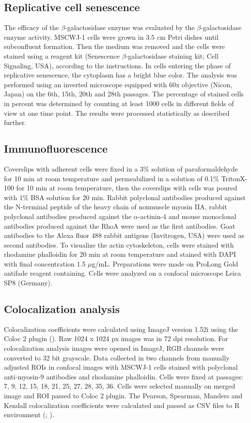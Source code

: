 \documentclass[alpha-refs]{wiley-article}
\begin{document}
\subsection{Replicative cell senescence}

The efficacy of the $\beta$-galactosidase enzyme was evaluated by the $\beta$-galactosidase enzyme activity.
MSCWJ-1 cells were grown in 3.5 cm Petri dishes until subconfluent formation.
Then the medium was removed and the cells were stained using a reagent kit (Senescence $\beta$-galactosidase staining kit; Cell Signaling, USA), according to the instructions.
In cells entering the phase of replicative senescence, the cytoplasm has a bright blue color.
The analysis was performed using an inverted microscope equipped with 60x objective (Nicon, Japan) on the 6th, 15th, 20th and 28th passages.
The percentage of stained cells in percent was determined by counting at least 1000 cells in different fields of view at one time point.
The results were processed statistically as described further.

\subsection{Immunofluorescence}

Coverslips with adherent cells were fixed in a 3\% solution of paraformaldehyde for 10 min at room temperature and permeabilized in a solution of 0.1\% TritonX-100 for 10 min at room temperature, then the coverslips with cells was poured with 1\% BSA solution for 20 min.
Rabbit polyclonal antibodies produced against the N-terminal peptide of the heavy chain of nonmuscle myosin IIA, rabbit polyclonal antibodies produced against the $\alpha$-actinin-4 and mouse monoclonal antibodies produced against the RhoA were used as the first antibodies.
Goat antibodies to the Alexa fluor 488 rabbit antigens (Invitrogen, USA) were used as second antibodies.
To visualize the actin cytoskeleton, cells were stained with rhodamine phalloidin for 20 min at room temperature and stained with DAPI with final concentration 1.5 $\mu$g/mL.
Preparations were made on ProLong Gold antifade reagent containing.
Cells were analyzed on a confocal microscope Leica SP8 (Germany).


\subsection{Colocalization analysis}

Colocalization coefficients were calculated using ImageJ version 1.52i using the Coloc 2 plugin (\cite{rueden2017imagej2}).
Raw 1024 x 1024 px images was in 72 dpi resolution.
For colocalization analysis images were opened in ImageJ, RGB channels were converted to 32 bit grayscale.
Data collected in two channels from manually adjusted ROIs in confocal images with MSCWJ-1 cells stained with polyclonal anti-myosin-9 antibodies and rhodamine phalloidin. Cells were fixed at passages: 7, 9, 12, 15, 18, 21, 25, 27, 28, 35, 36.
Cells were selected manually on merged image and ROI passed to Coloc 2 plugin.
The Pearson, Spearman, Manders and Kendall colocalization coefficients were calculated and passed as CSV files to R environment (\cite{adler2008replicate}; \cite{bergholm2010analysis}).
\end{document}
